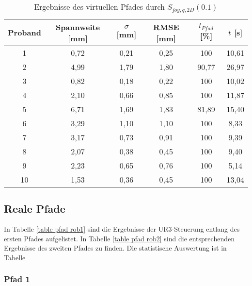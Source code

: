 \begin{table}[htb]
	\caption{Ergebnisse des virtuellen Pfades durch $S_{joy,q,2D}(0.1)$}
	\label{table pfad v k1}
	\begin{center}
		\begin{tabular}{|c|c|c|c|c|c|}
			\hline 
			Proband & Spannweite [mm] & $\sigma$ [mm] & RMSE [mm] & $t_{Pfad}$ [\%] & $t$ [s] \\ 
			\hline 	
			1 & 0,72 & 0,21 & 0,25 & 100 & 10,61  \\ 
			\hline
			2 & 4,99 & 1,79 & 1,80 & 90,77 & 26,97  \\ 
			\hline
			3 & 0,82 & 0,18 & 0,22 & 100 & 10,02  \\ 
			\hline 
			4 & 2,10 & 0,66 & 0,85 & 100 & 11,87  \\ 
			\hline 
			5 & 6,71 & 1,69 & 1,83 & 81,89 & 15,40  \\ 
			\hline 
			6 & 3,29 & 1,10 & 1,10 & 100 & 8,33  \\ 
			\hline 
			7 & 3,17 & 0,73 & 0,91 & 100 & 9,39  \\ 
			\hline 
			8 & 2,07 & 0,38 & 0,45 & 100 & 9,40  \\ 
			\hline 
			9 & 2,23 & 0,65 & 0,76 & 100 & 5,14  \\ 
			\hline 
			10 & 1,53 & 0,36 & 0,45 & 100 & 13,04  \\ 
			\hline 
		\end{tabular} 
	\end{center}
\end{table}


\subsection{Reale Pfade}
In Tabelle \ref{table pfad rob1} sind die Ergebnisse der UR3-Steuerung entlang des ersten Pfades aufgelistet. In Tabelle \ref{table pfad rob2} sind die entsprechenden Ergebnisse des zweiten Pfades zu finden. Die statistische Auswertung ist in Tabelle 

\subsubsection{Pfad 1}

